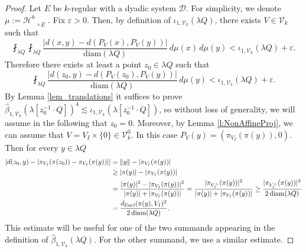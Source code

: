\documentclass[12pt]{amsart}
\renewcommand{\epsilon}{\varepsilon}
\numberwithin{equation}{section}
\theoremstyle{plain}
\theoremstyle{definition}
\theoremstyle{remark}
\begin{document}
\begin{proof} Let $E$ be $k$-regular with a dyadic system $\mathcal{D}$. For simplicity, we denote $\mu:=\mathcal{H}^k\llcorner_E$. 
Fix $\epsilon>0$. Then, by definition of $\iota_{1,\mathcal V_k}(\lambda Q)$, there exists $V\in\mathcal V_k$ such that 
  \[\fint_{\lambda Q}\fint_{\lambda Q}\frac{\left|d(x,y)-d(P_V(x),P_V(y))\right|}{\mathrm{diam}(\lambda Q)}\,d\mu(x)\,d\mu(y)< \iota_{1,\mathcal V_k}(\lambda Q)+\epsilon.\]
  Therefore there exists at least a point $z_0\in \lambda Q$ such that \begin{equation}\label{eq_z_0}\fint_{\lambda Q}\frac{\left|d(z_0,y)-d(P_V(z_0),P_V(y))\right|}{\mathrm{diam}(\lambda Q)}\,d\mu(y)< \iota_{1,\mathcal{V}_k}(\lambda Q)+\varepsilon.\end{equation}
By Lemma \ref{lem_translations} it suffices to prove $\widehat{\beta}_{1,\mathcal{V}_k}(\lambda[z_0^{-1}\cdot Q])^4\lesssim \iota_{1,\mathcal{V}_k}(\lambda [z_0^{-1}\cdot Q])$, so without loss of generality, we will assume in the following that $z_0=0$. Moreover, 
by  Lemma \ref{l:NonAffineProj}, we can assume that $V=V_I\times \{0\}\in \mathcal V_k^0$. 
  In this case $P_V(y)=(\pi_{V_I}(\pi(y)),0)$. Then for every $y\in\lambda Q$ \begin{align}
    |d(z_0,y)-|\pi_{V_I}(\pi(z_0))-\pi_{V_I}(\pi(y))||&=\|y\| -|\pi_{V_I}(\pi(y))|\notag\\
    &\geq |\pi(y)|-|\pi_{V_I}(\pi(y))|\notag\\
    &= \frac{|\pi(y)|^2-|\pi_{V_I}(\pi(y))|^2}{|\pi(y)|+|\pi_{V_I}(\pi(y))|}=\frac{|\pi_{V_I^{\bot}}(\pi(y))|^2}{|\pi(y)|+|\pi_{V_I}(\pi(y))|}\geq \frac{|\pi_{V_I^{\bot}}(\pi(y))|^2}{2\, \mathrm{diam}(\lambda Q)}\notag\\
    &=\frac{d_{\mathrm{Eucl}}(\pi(y),V_I)^2}{2\,\mathrm{diam}(\lambda Q)}.\label{eq:estHalfStratif1}
\end{align}
This estimate will be useful for one of the two summands appearing in the definition of $\widehat{\beta}_{1,\mathcal{V}_k}(\lambda Q)$. For the other summand, we use a similar estimate.


\end{proof}
\end{document}
